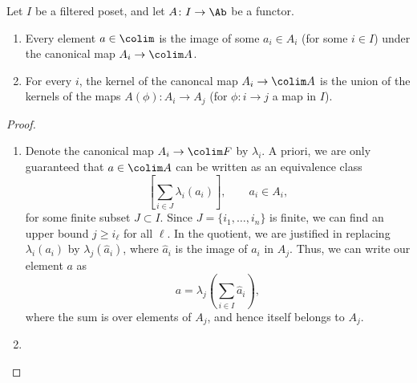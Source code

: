 \documentclass[main.tex]{subfiles}
\begin{document}
\begin{lemma}
  \label{lemma:properties_of_filtered_colimit}
  Let $I$ be a filtered poset, and let $A\colon I \to \Ab$ be a functor.
  \begin{enumerate}
    \item Every element $a \in \colim$ is the image of some $a_{i} \in A_{i}$ (for some $i \in I$) under the canonical map $A_{i} \to \colim A$.

    \item For every $i$, the kernel of the canoncal map $A_{i} \to \colim A$ is the union of the kernels of the maps $A(\phi)\colon A_{i} \to A_{j}$ (for $\phi\colon i \to j$ a map in $I$).
  \end{enumerate}
\end{lemma}
\begin{proof}
  \leavevmode
  \begin{enumerate}
    \item Denote the canonical map \(A_{i} \to \colim F\) by \(\lambda_{i}\). A priori, we are only guaranteed that $a \in \colim A$ can be written as an equivalence class
      \begin{equation*}
        \left[ \sum_{i \in J} \lambda_{i}(a_{i}) \right],\qquad a_{i} \in A_{i},
      \end{equation*}
      for some finite subset $J \subset I$. Since $J = \{i_{1}, \ldots, i_{n}\}$ is finite, we can find an upper bound $j \geq i_{\ell}$ for all $\ell$. In the quotient, we are justified in replacing \(\lambda_{i}(a_{i})\) by \(\lambda_{j}(\hat{a}_{i})\), where \(\hat{a}_{i}\) is the image of \(a_{i}\) in \(A_{j}\). Thus, we can write our element \(a\) as
      \begin{equation*}
        a = \lambda_{j}\left(\sum_{i \in I}\hat{a}_{i}\right),
      \end{equation*}
      where the sum is over elements of \(A_{j}\), and hence itself belongs to \(A_{j}\).

    \item 
  \end{enumerate}
\end{proof}
\end{document}
